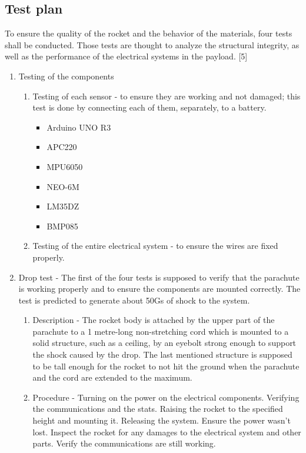 \subsection{Test plan}

To ensure the quality of the rocket and the behavior of the materials, four tests shall be conducted. Those tests are thought to analyze the structural integrity, as well as the performance of the electrical systems in the payload. [5]

\begin{enumerate}

\item Testing of the components
    \begin{enumerate}
        \item Testing of each sensor - to ensure they are working and not damaged; this test is done by connecting each of them, separately, to a battery.
            \begin{itemize}
                \item Arduino UNO R3
                \item APC220
                \item MPU6050
                \item NEO-6M
                \item LM35DZ
                \item BMP085
            \end{itemize}
        \item Testing of the entire electrical system - to ensure the wires are fixed properly.
    \end{enumerate}
\item Drop test
    - The first of the four tests is supposed to verify that the parachute is working properly and to ensure the components are mounted correctly. The test is predicted to generate about 50Gs of shock to the system.
    \begin{enumerate}
        \item Description - The rocket body is attached by the upper part of the parachute to a 1 metre-long non-stretching cord which is mounted to a solid structure, such as a ceiling, by an eyebolt strong enough to support the shock caused by the drop. The last mentioned structure is supposed to be tall enough for the rocket to not hit the ground when the parachute and the cord are extended to the maximum.
        \item Procedure - Turning on the power on the electrical components. Verifying the communications and the stats. Raising the rocket to the specified height and mounting it. Releasing the system. Ensure the power wasn't lost. Inspect the rocket for any damages to the electrical system and other parts. Verify the communications are still working.

\end{enumerate}
\end{enumerate}
